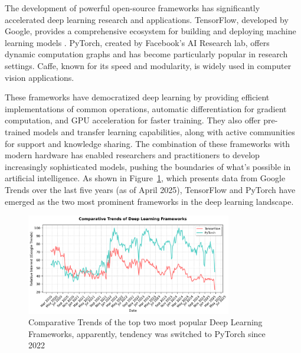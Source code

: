 The development of powerful open-source frameworks has significantly
accelerated deep learning research and applications. TensorFlow,
developed by Google, provides a comprehensive ecosystem for building
and deploying machine learning models \cite{AbadiEtAl2016}. PyTorch,
created by Facebook's AI Research lab, offers dynamic computation
graphs and has become particularly popular in research settings.
Caffe, known for its speed and modularity, is widely used in computer
vision applications.

These frameworks have democratized deep learning by providing
efficient implementations of common operations, automatic
differentiation for gradient computation, and GPU acceleration for
faster training. They also offer pre-trained models and transfer
learning capabilities, along with active communities for support and
knowledge sharing. The combination of these frameworks with modern
hardware has enabled researchers and practitioners to develop
increasingly sophisticated models, pushing the boundaries of what's
possible in artificial intelligence. As shown in
Figure~\ref{fig:dl_frameworks_trends}, which presents data from
Google Trends over the last five years (as of April 2025), TensorFlow
and PyTorch have emerged as the two most prominent frameworks in the
deep learning landscape.

\begin{figure}[h]
  \centering
  \includegraphics[width=0.8\textwidth]{Cap2/Figures/dl_frameworks_trends.png}
  \caption{Comparative Trends of the top two most popular Deep
  Learning Frameworks, apparently, tendency was switched to PyTorch since 2022}
  \label{fig:dl_frameworks_trends}
\end{figure}